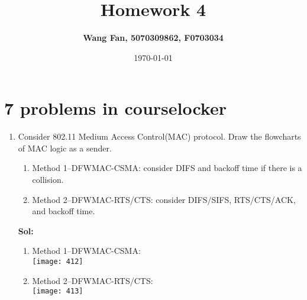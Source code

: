 \documentclass[11pt]{article}
\begin{document}
\title{\textbf{Homework 4}}
\author{\textbf{Wang Fan, 5070309862, F0703034}}
\date{\today}
\maketitle

\section*{7 problems in courselocker}
\begin{enumerate}
\item Consider 802.11 Medium Access Control(MAC) protocol. Draw the flowcharts of MAC logic as a sender.
	\begin{enumerate}
	\item Method 1--DFWMAC-CSMA: consider DIFS and backoff time if there is a collision.
	\item Method 2--DFWMAC-RTS/CTS: consider DIFS/SIFS, RTS/CTS/ACK, and backoff time.
	\end{enumerate}
\textbf{Sol:}
	\begin{enumerate}
	\item Method 1--DFWMAC-CSMA:\\
	\texttt{[image: 412]}\\
	\item Method 2--DFWMAC-RTS/CTS:\\
	\texttt{[image: 413]}\\
	\end{enumerate}


\end{enumerate}
\end{document}
